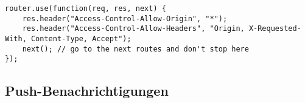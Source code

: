 \begin{lstlisting}[caption={Router-Middleware um jedem Response die \code{Access-Control}-Header hinzuzufügen},label={lst_realisierung_router-cross-domain}, frame=single]
router.use(function(req, res, next) {
    res.header("Access-Control-Allow-Origin", "*");
    res.header("Access-Control-Allow-Headers", "Origin, X-Requested-With, Content-Type, Accept");
    next(); // go to the next routes and don't stop here
});
\end{lstlisting}


\subsection{Push-Benachrichtigungen}


